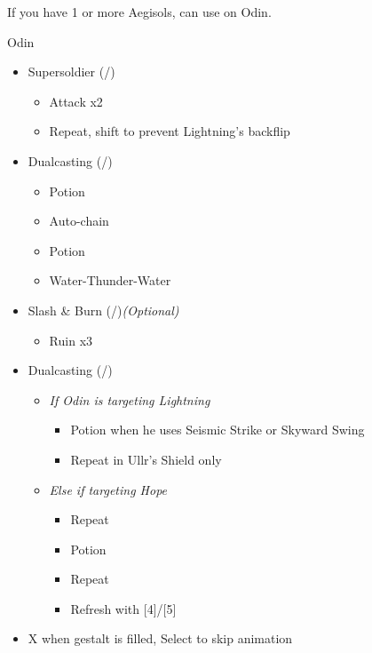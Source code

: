\begin{multicols}{2}
\renewcommand{\first}{[1] Slash \& Burn (\com/\rav)}
\renewcommand{\second}{[2] Supersoldier (\com/\syn)}
\renewcommand{\fourth}{[4] Dualcasting (\rav/\rav)}
\renewcommand{\fifth}{[5] Dualcasting (\rav/\rav)}
If you have 1 or more Aegisols, can use on Odin.
\begin{battle}{Odin}
\begin{itemize}
    \item \second
    \begin{itemize}
        \item Attack x2
        \item Repeat, shift to prevent Lightning's backflip
    \end{itemize}
    \item \fourth
    \begin{itemize}
        \item Potion
        \item Auto-chain
        \item Potion
        \item Water-Thunder-Water
    \end{itemize}
	\item \first \textit{(Optional)}
	\begin{itemize}
		\item Ruin x3
	\end{itemize}
    \columnbreak
    \item \fifth
    \begin{itemize}
        \item \textit{If Odin is targeting Lightning}
        \begin{itemize}
            \item Potion when he uses Seismic Strike or Skyward Swing
            \item Repeat in Ullr's Shield only
        \end{itemize}
        \item \textit{Else if targeting Hope}
        \begin{itemize}
            \item Repeat
            \item Potion
            \item Repeat
            \item Refresh with [4]/[5]
        \end{itemize}
    \end{itemize}
    \item X when gestalt is filled, Select to skip animation
\end{itemize}

\end{battle}
\end{multicols}
